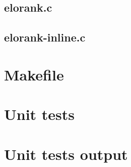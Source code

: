\subsection{elorank.c}

\begin{scriptsize}
\begin{ttfamily}

\end{ttfamily}
\end{scriptsize}

\subsection{elorank-inline.c}

\begin{scriptsize}
\begin{ttfamily}

\end{ttfamily}
\end{scriptsize}

\section{Makefile}

\begin{scriptsize}
\begin{ttfamily}

\end{ttfamily}
\end{scriptsize}

\section{Unit tests}

\begin{scriptsize}
\begin{ttfamily}

\end{ttfamily}
\end{scriptsize}

\section{Unit tests output}

\begin{scriptsize}
\begin{ttfamily}

\end{ttfamily}
\end{scriptsize}

